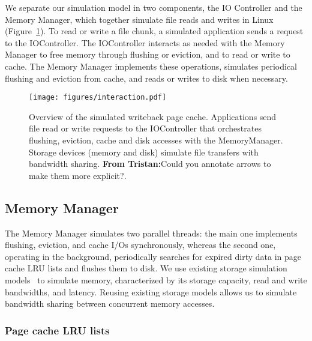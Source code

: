 \documentclass[conference]{IEEEtran}
\newcommand{\tristan}[1]{\color{orange}\textbf{From Tristan:}#1\color{black}}
\begin{document}
    We separate our simulation model in two components, the IO
    Controller and the Memory Manager, which together simulate 
    file reads and writes in Linux (Figure~\ref{fig:interaction}). 
    To read or write a file chunk, a simulated application sends a
    request to the IOController. The IOController interacts as needed with
    the Memory Manager to free memory through flushing or eviction,
    and to read or write to cache. The Memory Manager
    implements these operations, simulates periodical flushing
    and eviction from cache, and reads or writes to disk when necessary.
    \begin{figure}
           \centering
           \texttt{[image: figures/interaction.pdf]}
           \caption{Overview of the simulated writeback page cache.
           Applications send file read or write requests to the
           IOController that orchestrates flushing, eviction, cache
           and disk accesses with the MemoryManager. Storage
           devices (memory and disk) simulate file transfers with
           bandwidth sharing. \tristan{Could you annotate arrows to
           make them more explicit?}.}
           \label{fig:interaction}
    \end{figure}

    \subsection{Memory Manager}

    The Memory Manager simulates two parallel threads: the main one
    implements flushing, eviction, and cache I/Os synchronously, whereas
    the second one, operating in the background, periodically searches for
    expired dirty data in page cache LRU lists and flushes them to disk. We
    use existing storage simulation models~\cite{lebre2015} to simulate
    memory, characterized by its storage capacity, read and write
    bandwidths, and latency. Reusing existing storage models allows us to
    simulate bandwidth sharing between concurrent memory accesses.

    \subsubsection{Page cache LRU lists}
\end{document}
